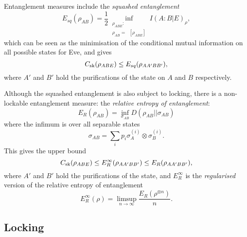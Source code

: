 \documentclass[10pt, a4paper]{article}
\numberwithin{equation}{section} %
\theoremstyle{definition}
\theoremstyle{plain}
\newcommand{\?}{\mathrel{?}} %
\newcommand{\Tr}[2][]{\mathop{\mathrm{Tr}#1}\left[ #2 \right]} %
\newcommand{\sk}{\rm sk}
\begin{document}
    Entanglement measures include the \emph{squashed entanglement}
    \begin{equation}
      E_{sq}(\rho_{A B}) = \frac{1}{2} \inf_{\substack{\rho_{A BE} : \\ \rho_{A B} = \Tr[_E]{\rho_{A BE}}}} I{(A:B|E)}_{\rho},
    \end{equation}
    which can be seen as the minimisation of the conditional mutual information on all possible states for Eve, and gives
    \begin{equation}
      C_{\sk}(\rho_{A B E}) \leq E_{sq}(\rho_{A A' B B'}),
    \end{equation}
    where \(A'\) and \(B'\) hold the purifications of the state on \(A\) and \(B\) respectively.

    Although the squashed entanglement is also subject to locking, there is a non-lockable entanglement measure: the \emph{relative entropy of entanglement}:
    \begin{equation}
      E_R\left({\rho_{AB}}\right) = \inf_{\sigma_{AB}} D(\rho_{AB}||\sigma_{AB})
    \end{equation}
    where the infimum is over all separable states
    \begin{equation}
      \sigma_{AB} = \sum_i p_i \sigma_{A}^{(i)} \otimes \sigma_{B}^{(i)}.
    \end{equation}
    This gives the upper bound
    \begin{equation}
      C_{\sk}(\rho_{A B E}) \leq E_{R}^{\infty}(\rho_{A A' B B'}) \leq E_{R}(\rho_{A A' B B'}),
    \end{equation}
    where \(A'\) and \(B'\) hold the purifications of the state, and \(E_{R}^{\infty}\) is the \emph{regularised} version of the relative entropy of entanglement
    \begin{equation}
      E_{R}^{\infty}(\rho) = \limsup_{n\to\infty} \frac{E_R(\rho^{\otimes n})}{n}.
    \end{equation}

    \subsection{Locking}\label{sec:diqkd_lock}
\end{document}
